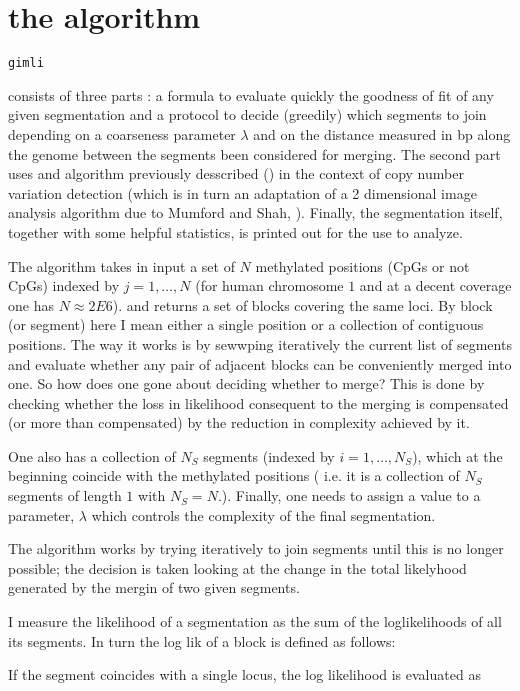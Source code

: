 \documentclass[11pt]{amsart}
\newcommand{\gimli}{\begin{verbatim}gimli\end{verbatim}}
\begin{document}
\section{the algorithm}

\gimli consists of three parts : a formula to evaluate quickly the 
goodness of fit of any given segmentation
and a protocol to decide (greedily) which  segments to join depending 
on a coarseness parameter $\lambda$ and on the distance measured in bp along
the genome between the segments been considered for merging. 
The second part uses and  algorithm previously desscribed   (\cite{vega}) in 
the context of copy number variation detection (which is in turn an adaptation 
of a 2 dimensional image analysis algorithm due to Mumford and Shah, 
\cite{mumfordshah}). Finally, the segmentation itself, together with some 
helpful statistics, is printed out for the use to analyze.

The algorithm takes in input a set of $N$ methylated positions 
(CpGs or not CpGs) indexed by $j=1,\dots,N$ 
(for human chromosome $1$ and at a 
decent coverage one has $N \approx 2E6$).
and returns a set of blocks covering the same loci.
By block (or segment) here I mean either a single position or a collection
of contiguous positions. The way it works is by sewwping
iteratively the current list of segments and evaluate whether any pair 
of adjacent blocks can be conveniently merged into one. So how does one gone about
deciding whether to merge? This is  done by checking whether the loss in 
likelihood consequent to the merging is compensated (or more than compensated)
by the reduction in complexity achieved by it.

One also has a collection of $N_S$ 
segments (indexed by $i=1,\dots,N_S$), 
which at the beginning
coincide with the methylated positions ( i.e. it is a collection of $N_S$ 
segments of length $1$ with $N_S=N$.).
Finally, one needs to assign a value to a parameter, $\lambda$ which controls the 
complexity of the final segmentation.

The algorithm works by trying iteratively to join segments until this
is no longer possible; the decision is taken looking at the change
in the total likelyhood generated by the mergin of two given segments. 

I measure the likelihood of a segmentation as the sum of the loglikelihoods
of all its segments. In turn the log lik of a block is defined as follows:

If the
segment coincides with a single locus, 
the log likelihood  is evaluated as 
\end{document}
